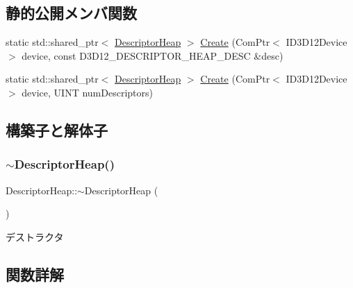 \subsection*{静的公開メンバ関数}
\begin{DoxyCompactItemize}
\item 
static std\+::shared\+\_\+ptr$<$ \mbox{\hyperlink{class_descriptor_heap}{Descriptor\+Heap}} $>$ \mbox{\hyperlink{class_descriptor_heap_aae33b8a5c2d8e825ba93c14c99a141c8}{Create}} (Com\+Ptr$<$ I\+D3\+D12\+Device $>$ device, const D3\+D12\+\_\+\+D\+E\+S\+C\+R\+I\+P\+T\+O\+R\+\_\+\+H\+E\+A\+P\+\_\+\+D\+E\+SC \&desc)
\item 
static std\+::shared\+\_\+ptr$<$ \mbox{\hyperlink{class_descriptor_heap}{Descriptor\+Heap}} $>$ \mbox{\hyperlink{class_descriptor_heap_adb1b77c9b8ccc63e0f500c43dd3b2d3a}{Create}} (Com\+Ptr$<$ I\+D3\+D12\+Device $>$ device, U\+I\+NT num\+Descriptors)
\end{DoxyCompactItemize}


\subsection{構築子と解体子}
\mbox{\label{class_descriptor_heap_a784aaaafaa338085c029c29d97f802c0}} 
\subsubsection{\texorpdfstring{$\sim$\+Descriptor\+Heap()}{~DescriptorHeap()}}
{\footnotesize\ttfamily Descriptor\+Heap\+::$\sim$\+Descriptor\+Heap (\begin{DoxyParamCaption}{ }\end{DoxyParamCaption})}



デストラクタ 



\subsection{関数詳解}
\mbox{\label{class_descriptor_heap_ad4c58082394b6dedc4f6eaaed9b2da1c}} 
